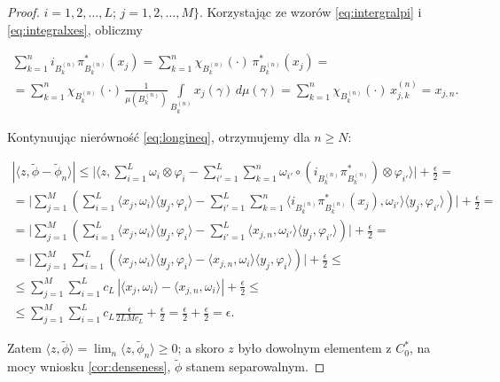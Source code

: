 \begin{proof}
$i = 1,2, \ldots, L$; $j = 1,2, \ldots, M \}$.
Korzystając ze wzorów \eqref{eq:intergralpi} i \eqref{eq:integralxes},
obliczmy
\begin{linenomath*}
 \begin{multline}
\sum \limits_{k=1}^{n} i_{B_{k}^{(n)}} \pi^{*}_{B_{k}^{(n)}} (x_{j})
=\sum \limits_{k=1}^{n} \chi_{B_{k}^{(n)}}(\cdot) \,
\pi^{*}_{B_{k}^{(n)}} (x_{j}) = \\
=\sum \limits_{k=1}^{n} \chi_{B_{k}^{(n)}}(\cdot) \,
\frac{1}{\mu(B_{k}^{(n)})}
\int \limits_{B_{k}^{(n)}} x_{j}(\gamma) \, d\mu(\gamma)
=\sum \limits_{k=1}^{n} \chi_{B_{k}^{(n)}}(\cdot) \,
x_{j,k}^{(n)}=x_{j,n}.
 \end{multline}
\end{linenomath*}
Kontynuując nierówność \eqref{eq:longineq}, otrzymujemy dla $n \geq N$:
\begin{linenomath*}
 \begin{multline}
|\langle z, \tilde{\phi} - \tilde{\phi}_{n} \rangle|\leq \Big |\langle z,
\sum \limits_{i=1}^{L} \omega_{i} \otimes \varphi_{i} -\sum \limits_{i'=1}^{L}
\sum \limits_{k=1}^{n}\omega_{i'} \circ (i_{B_{k}^{(n)}} \pi^{*}_{B_{k}^{(n)}})
\otimes \varphi_{i'}\rangle \Big | + \frac{\epsilon}{2} =\\
= \Big |  \sum \limits_{j=1}^{M}\left( \sum \limits_{i =1}^{L}
\langle x_{j}, \omega_{i} \rangle \langle y_{j}, \varphi_{i} \rangle -
\sum \limits_{i'=1}^{L} \sum \limits_{k=1}^{n}
\langle i_{B_{k}^{(n)}} \pi^{*}_{B_{k}^{(n)}} (x_{j}) ,
\omega_{i'} \rangle \langle y_{j}, \varphi_{i'} \rangle
\right) \Big |  + \frac{\epsilon}{2} =\\
= \Big | \sum \limits_{j=1}^{M}\left( \sum \limits_{i=1}^{L}
\langle x_{j}, \omega_{i} \rangle \langle y_{j}, \varphi_{i} \rangle  -
\sum \limits_{i'=1}^{L}\langle x_{j,n} , \omega_{i'} \rangle \langle y_{j}, \varphi_{i'} \rangle
\right) \Big |  + \frac{\epsilon}{2} =\\
= \Big | \sum \limits_{j=1}^{M} \sum \limits_{i=1}^{L}
\left(\langle x_{j}, \omega_{i} \rangle \langle y_{j}, \varphi_{i} \rangle  -
\langle x_{j,n} , \omega_{i} \rangle \langle y_{j}, \varphi_{i} \rangle
\right) \Big |  + \frac{\epsilon}{2} \leq \\
\leq \sum \limits_{j=1}^{M} \sum \limits_{i=1}^{L}
c_{L}  \, \left | \langle    x_{j}, \omega_{i} \rangle -
\langle x_{j,n} , \omega_{i} \rangle\right | + \frac{\epsilon}{2} \leq \\
\leq \sum \limits_{j=1}^{M} \sum \limits_{i=1}^{L}
c_{L}  \frac{\epsilon}{2 L M c_{L}}     + \frac{\epsilon}{2}
=  \frac{\epsilon}{2} +  \frac{\epsilon}{2} =  \epsilon.
 \end{multline}
\end{linenomath*}
Zatem  $\langle z , \tilde{\phi} \rangle  =
\lim_{n} \langle z , \tilde{\phi}_{n} \rangle \geq 0$;
a skoro $z$ było dowolnym elementem z $C_{0}^{*}$,
na mocy wniosku \ref{cor:denseness}, $\tilde{\phi}$ stanem separowalnym.
\end{proof}

